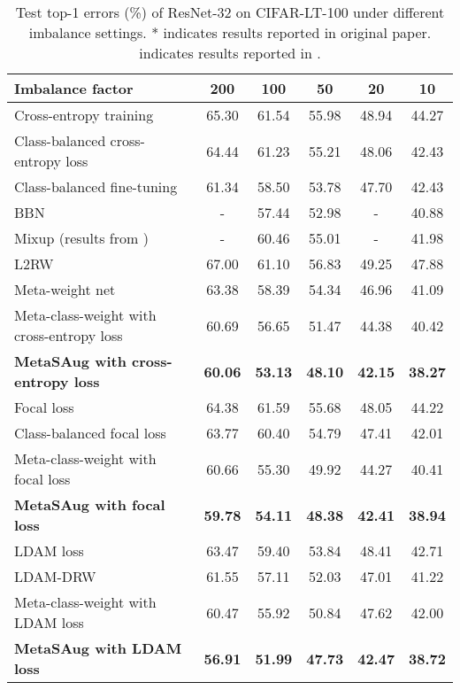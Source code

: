 \begin{table*}
	\centering
	\caption {Test top-1 errors (\%) of ResNet-32 on CIFAR-LT-100 under different imbalance settings. * indicates results reported in original paper.  indicates results reported in \cite{jamal2020rethinking}.}
	{\begin{tabular}{l|c|c|c|c|c}
			\hline
			Imbalance factor & 200 & 100 & 50 & 20 & 10 \\ \hline
			
			Cross-entropy training & 65.30 & 61.54 & 55.98 & 48.94 & 44.27 \\ \hline
			Class-balanced cross-entropy loss \cite{cui2019class} & 64.44 & 61.23 & 55.21 & 48.06 & 42.43 \\ \hline
			Class-balanced fine-tuning \cite{cui2018large} & 61.34 & 58.50 & 53.78 & 47.70 & 42.43 \\ \hline
			BBN \cite{BBN} & - & 57.44 & 52.98 & - & 40.88 \\ \hline
			Mixup \cite{mixup} (results from \cite{BBN}) & - & 60.46 & 55.01 & - & 41.98 \\ \hline
			L2RW \cite{L2RW} & 67.00 & 61.10 & 56.83 & 49.25 & 47.88 \\ \hline
			Meta-weight net \cite{MetaWeightNet} & 63.38 & 58.39 & 54.34 & 46.96 & 41.09 \\ \hline
			Meta-class-weight with cross-entropy loss \cite{jamal2020rethinking} & 60.69 & 56.65 & 51.47 & 44.38 & 40.42 \\ \hline
			\textbf{MetaSAug with cross-entropy loss} & \textbf{60.06} & \textbf{53.13} & \textbf{48.10} & \textbf{42.15} & \textbf{38.27} \\ \hline\hline 
		
			Focal loss \cite{lin2017focal} & 64.38 & 61.59 & 55.68 & 48.05 & 44.22  \\ \hline
		
			Class-balanced focal loss \cite{cui2019class} & 63.77 & 60.40 & 54.79 & 47.41 & 42.01  \\ \hline
			Meta-class-weight with focal loss \cite{jamal2020rethinking}& 60.66 & 55.30 & 49.92 & 44.27 & 40.41 \\ \hline
			\textbf{MetaSAug with focal loss} & \textbf{59.78} & \textbf{54.11} & \textbf{48.38} & \textbf{42.41} & \textbf{38.94} \\ \hline\hline 
		
			LDAM loss \cite{cao2019learning}  & 63.47 & 59.40  & 53.84 & 48.41 & 42.71  \\ \hline
			LDAM-DRW \cite{cao2019learning} & 61.55 & 57.11 & 52.03 & 47.01 & 41.22 \\ \hline
			Meta-class-weight with LDAM loss \cite{jamal2020rethinking} & 60.47 & 55.92 & 50.84 & 47.62 & 42.00 \\ \hline
			\textbf{MetaSAug with LDAM loss} & \textbf{56.91} & \textbf{51.99} & \textbf{47.73} & \textbf{42.47} & \textbf{38.72} \\ \hline
		\end{tabular}
	}
	\label{tab:CIFAR-100}
\end{table*}

